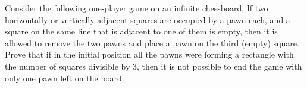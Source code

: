 Consider the following one-player game on an infinite chessboard. If two horizontally or vertically adjacent squares are occupied by a pawn each, and a square on the same line that is adjacent to one of them is empty, then it is allowed to remove the two pawns and place a pawn on the third (empty) square. Prove that if in the initial position all the pawns were forming a rectangle with the number of squares divisible by $3$, then it is not possible to end the game with only one pawn left on the board.